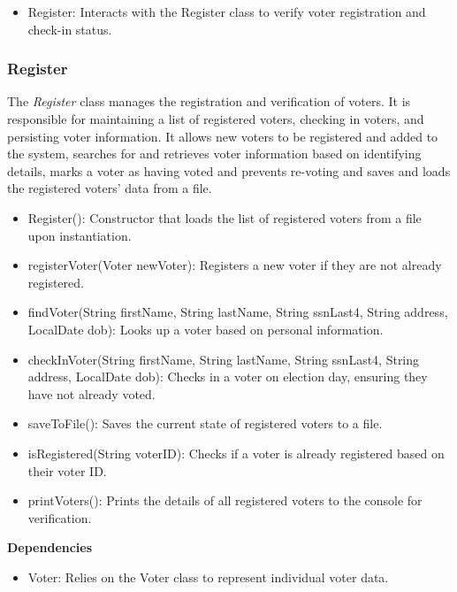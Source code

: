 \documentclass{article}
\begin{document}
\begin{itemize}
    \item Register: Interacts with the Register class to verify voter registration and check-in status.
\end{itemize}

\subsubsection{Register}
The \textit{Register} class manages the registration and verification of voters. It is responsible for maintaining a list of registered voters, checking in voters, and persisting voter information. It allows new voters to be registered and added to the system, searches for and retrieves voter information based on identifying details, marks a voter as having voted and prevents re-voting and saves and loads the registered voters' data from a file.

\begin{itemize}
    \item Register(): Constructor that loads the list of registered voters from a file upon instantiation.
    \item registerVoter(Voter newVoter): Registers a new voter if they are not already registered.
    \item findVoter(String firstName, String lastName, String ssnLast4, String address, LocalDate dob): Looks up a voter based on personal information.
    \item checkInVoter(String firstName, String lastName, String ssnLast4, String address, LocalDate dob): Checks in a voter on election day, ensuring they have not already voted.
    \item saveToFile(): Saves the current state of registered voters to a file.
    \item isRegistered(String voterID): Checks if a voter is already registered based on their voter ID.
    \item printVoters(): Prints the details of all registered voters to the console for verification.
\end{itemize}
\textbf{Dependencies}

\begin{itemize}
    \item Voter: Relies on the Voter class to represent individual voter data.
\end{itemize}
\end{document}
